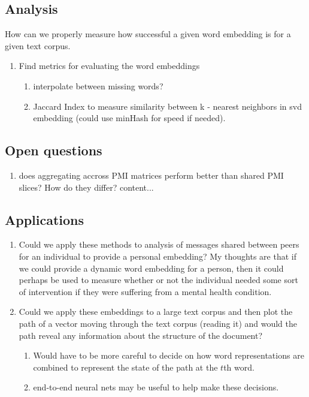 \documentclass{report}
\begin{document}
	\subsection{Analysis}
		How can we properly measure how successful a given word embedding is for a given text corpus. 
		\begin{enumerate}
			\item Find metrics for evaluating the word embeddings
			\begin{enumerate}
				\item interpolate between missing words?
				\item Jaccard Index to measure similarity between k - nearest neighbors in svd embedding (could use minHash for speed if needed).
			\end{enumerate}
		\end{enumerate}
	\subsection{Open questions}
	\begin{enumerate}
		\item does aggregating accross PMI matrices perform better than shared PMI slices? How do they differ? 
		content...
	\end{enumerate}
	\subsection{Applications}
	\begin{enumerate}
		\item Could we apply these methods to analysis of messages shared between peers for an individual to provide a personal embedding? My thoughts are that if we could provide a dynamic word embedding for a person, then it could perhaps be used to measure whether or not the individual needed some sort of intervention if they were suffering from a mental health condition. 
		\item Could we apply these embeddings to a large text corpus and then plot the path of a vector moving through the text corpus (reading it) and would the path reveal any information about the structure of the document? 
		\begin{enumerate}
			\item Would have to be more careful to decide on how word representations are combined to represent the state of the path at the $ t $th word.
			\item end-to-end neural nets may be useful to help make these decisions. 
		\end{enumerate}
	\end{enumerate}
    
\end{document}
